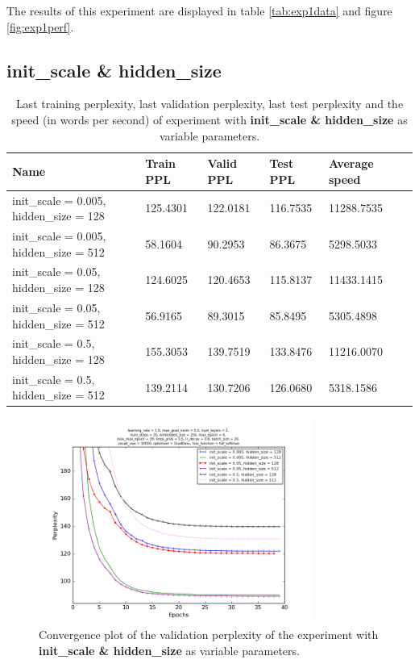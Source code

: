 \documentclass[10pt,a4paper,titlepage]{article}
\begin{document}
The results of this experiment are displayed in table \ref{tab:exp1data} and figure \ref{fig:exp1perf}.

\newpage

\subsection{init\_scale \& hidden\_size}

\begin{table}[H]
\centering
\caption{Last training perplexity, last validation perplexity, last test perplexity and the speed (in words per second) of experiment with \textbf{init\_scale \& hidden\_size} as variable parameters.}
\label{tab:exp2data}
\begin{tabular}{|l|l|l|l|l|l|}
\hline
{\small Name} & {\small Train PPL} & {\small Valid PPL} & {\small Test PPL} & {\small Average speed}\\ \hline
{\small init\_scale = 0.005, hidden\_size = 128}         & 125.4301   & 122.0181   & 116.7535   & 11288.7535 \\ \hline
{\small init\_scale = 0.005, hidden\_size = 512}         & 58.1604    & 90.2953    & 86.3675    & 5298.5033  \\ \hline
{\small init\_scale = 0.05, hidden\_size = 128}          & 124.6025   & 120.4653   & 115.8137   & 11433.1415 \\ \hline
{\small init\_scale = 0.05, hidden\_size = 512}          & 56.9165    & 89.3015    & 85.8495    & 5305.4898  \\ \hline
{\small init\_scale = 0.5, hidden\_size = 128}           & 155.3053   & 139.7519   & 133.8476   & 11216.0070 \\ \hline
{\small init\_scale = 0.5, hidden\_size = 512}           & 139.2114   & 130.7206   & 126.0680   & 5318.1586  \\ \hline
\end{tabular}
\end{table}

\begin{figure}[H]
	\begin{center}
		\includegraphics[width=0.80\textwidth]{Figures/inithiddenperf.png}
		\caption{Convergence plot of the validation perplexity of the experiment with \textbf{init\_scale \& hidden\_size} as variable parameters. }
		\label{fig:exp2perf}
	\end{center}	
\end{figure}
\end{document}
